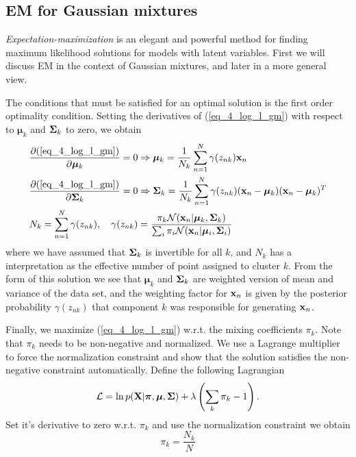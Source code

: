 \documentclass[../main.tex]{subfiles}
\begin{document}
\subsection{EM for Gaussian mixtures}
\emph{Expectation-maximization} is an elegant and powerful method for finding maximum likelihood solutions for models with latent variables. First we will discuss EM in the context of Gaussian mixtures, and later in a more general view.
\par The conditions that must be satisfied for an optimal solution is the first order optimality condition. Setting the derivatives of (\ref{eq_4_log_l_gm}) with respect to $\bm{\mu}_k$ and ${\bf \Sigma}_k$ to zero, we obtain
\begin{align}
\label{eq_4_mu}&\frac{\partial (\ref{eq_4_log_l_gm})}{\partial \bm{\mu}_k}=0\Rightarrow \bm{\mu}_k = \frac{1}{N_k}\sum_{n=1}^{N}\gamma(z_{nk}){\bf x}_n\\
\label{eq_4_sigma}&\frac{\partial (\ref{eq_4_log_l_gm})}{\partial {\bf \Sigma}_k}=0\Rightarrow {\bf \Sigma}_k=\frac{1}{N_k}\sum_{n=1}^{N}\gamma(z_{nk}) ({\bf x}_n-\bm{\mu}_k)({\bf x}_n-\bm{\mu}_k)^T\\
\label{eq_4_gamma}&N_k = \sum_{n=1}^{N}\gamma(z_{nk}), \quad\gamma(z_{nk}) = \frac{\pi_k \mathcal{N}({\bf x}_n|\bm{\mu}_k,{\bf \Sigma}_k)}{\sum_i\pi_i \mathcal{N}({\bf x}_n|\bm{\mu}_i,{\bf \Sigma}_i)} 
\end{align}
where we have assumed that ${\bf \Sigma}_k$ is invertible for all $k$, and $N_k$ has a interpretation as the effective number of point assigned to cluster $k$. From the form of this solution we see that $\bm{\mu}_k$ and ${\bf \Sigma}_k$ are weighted version of mean and variance of the data set, and the weighting factor for ${\bf x}_n$ is given by the posterior probability $\gamma(z_{nk})$ that component $k$ was responsible for generating ${\bf x}_n$.
\par Finally, we maximize (\ref{eq_4_log_l_gm}) w.r.t. the mixing coefficients $\pi_k$. Note that $\pi_k$ needs to be non-negative and normalized. We use a Lagrange multiplier to force the normalization constraint and show that the solution satisfies the non-negative constraint automatically. Define the following Lagrangian
\begin{equation*}
\mathcal{L}=\ln p({\bf X}|\bm{\pi},\bm{\mu},{\bf \Sigma}) + \lambda\left(\sum_k \pi_k-1\right).
\end{equation*}
Set it's derivative to zero w.r.t. $\pi_k$ and use the normalization constraint we obtain
\begin{equation}\label{eq_4_pi}
\pi_k = \frac{N_k}{N} 
\end{equation}
\end{document}
